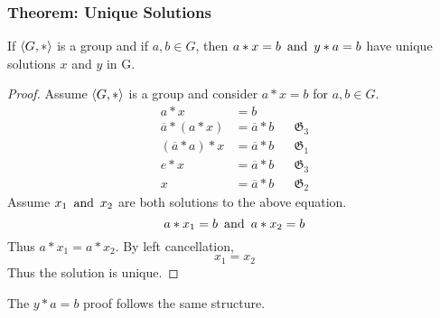 \subsubsection*{Theorem: Unique Solutions}
If $\langle G,* \rangle$ is a group and if $a,b \in G$, then $a*x=b \operatorname{~\text{and}~} y*a=b$ have unique solutions $x$ and $y$ in G.
\begin{proof}
    Assume $\langle G,* \rangle$ is a group and consider $a*x=b$ for $a,b \in G$.
    \begin{align*}
        a*x & = b \\
        \overline{a} * (a*x) & = \overline{a} * b && \mathfrak{G}_3 \\
        (\overline{a} * a) *x & = \overline{a} * b && \mathfrak{G}_1 \\
        e * x & = \overline{a} * b && \mathfrak{G}_3 \\
        x & = \overline{a} * b && \mathfrak{G}_2
    \end{align*}
    Assume $x_1 \operatorname{~\text{and}~} x_2$ are both solutions to the above equation.
    \[
        a*x_1 =b \operatorname{~\text{and}~} a * x_2 = b
    \]
    Thus $a*x_1 = a*x_2$. By left cancellation,
    \[
        x_1 = x_2
    \]
    Thus the solution is unique.
\end{proof}
The $y*a=b$ proof follows the same structure.
